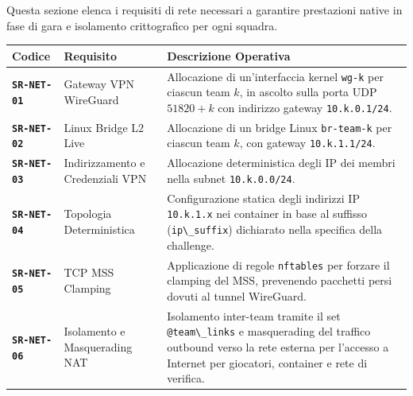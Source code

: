 Questa sezione elenca i requisiti di rete necessari a garantire
prestazioni native in fase di gara e isolamento crittografico per ogni
squadra.

\begin{longtable}[]{@{}
  >{\raggedright\arraybackslash}p{}
  >{\raggedright\arraybackslash}p{}
  >{\raggedright\arraybackslash}p{}@{}}
\toprule\noalign{}
\begin{minipage}[b]{\linewidth}\raggedright
Codice
\end{minipage} & \begin{minipage}[b]{\linewidth}\raggedright
Requisito
\end{minipage} & \begin{minipage}[b]{\linewidth}\raggedright
Descrizione Operativa
\end{minipage} \\
\midrule\noalign{}
\endhead
\bottomrule\noalign{}
\endlastfoot
\textbf{\passthrough{\lstinline!SR-NET-01!}} & Gateway VPN WireGuard &
Allocazione di un'interfaccia kernel \passthrough{\lstinline!wg-k!} per
ciascun team \(k\), in ascolto sulla porta UDP \(51820 + k\) con
indirizzo gateway \passthrough{\lstinline!10.k.0.1/24!}. \\
\textbf{\passthrough{\lstinline!SR-NET-02!}} & Linux Bridge L2 Live &
Allocazione di un bridge Linux \passthrough{\lstinline!br-team-k!} per
ciascun team \(k\), con gateway
\passthrough{\lstinline!10.k.1.1/24!}. \\
\textbf{\passthrough{\lstinline!SR-NET-03!}} & Indirizzamento e
Credenziali VPN & Allocazione deterministica degli IP dei membri nella
subnet \passthrough{\lstinline!10.k.0.0/24!}. \\
\textbf{\passthrough{\lstinline!SR-NET-04!}} & Topologia Deterministica
& Configurazione statica degli indirizzi IP
\passthrough{\lstinline!10.k.1.x!} nei container in base al suffisso
(\passthrough{\lstinline!ip\_suffix!}) dichiarato nella specifica della
challenge. \\
\textbf{\passthrough{\lstinline!SR-NET-05!}} & TCP MSS Clamping &
Applicazione di regole \passthrough{\lstinline!nftables!} per forzare il
clamping del MSS, prevenendo pacchetti persi dovuti al tunnel
WireGuard. \\
\textbf{\passthrough{\lstinline!SR-NET-06!}} & Isolamento e Masquerading
NAT & Isolamento inter-team tramite il set
\passthrough{\lstinline!@team\_links!} e masquerading del traffico
outbound verso la rete esterna per l'accesso a Internet per giocatori,
container e rete di verifica. \\
\end{longtable}


